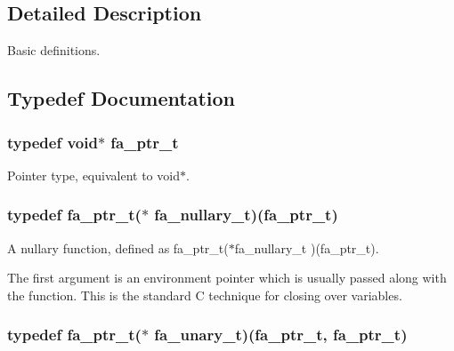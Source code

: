 \subsection{Detailed Description}
Basic definitions. 

\subsection{Typedef Documentation}
\hypertarget{group___fa_ga915ddeae99ad7568b273d2b876425197}{
\subsubsection[{fa\-\_\-ptr\-\_\-t}]{\setlength{\rightskip}{0pt plus 5cm}typedef void$\ast$ {\bf fa\-\_\-ptr\-\_\-t}}}\label{group___fa_ga915ddeae99ad7568b273d2b876425197}


Pointer type, equivalent to {\ttfamily void$\ast$}. 

\hypertarget{group___fa_ga43b940a9294fd58a54087ef0b416e479}{
\subsubsection[{fa\-\_\-nullary\-\_\-t}]{\setlength{\rightskip}{0pt plus 5cm}typedef {\bf fa\-\_\-ptr\-\_\-t}($\ast$  fa\-\_\-nullary\-\_\-t)({\bf fa\-\_\-ptr\-\_\-t})}}\label{group___fa_ga43b940a9294fd58a54087ef0b416e479}


A nullary function, defined as {\ttfamily fa\-\_\-ptr\-\_\-t($\ast$fa\-\_\-nullary\-\_\-t )(fa\-\_\-ptr\-\_\-t)}. 

The first argument is an environment pointer which is usually passed along with the function. This is the standard C technique for closing over variables. \hypertarget{group___fa_gaaafae8ab9ebae9019133108e56d2d4d1}{
\subsubsection[{fa\-\_\-unary\-\_\-t}]{\setlength{\rightskip}{0pt plus 5cm}typedef {\bf fa\-\_\-ptr\-\_\-t}($\ast$  fa\-\_\-unary\-\_\-t)({\bf fa\-\_\-ptr\-\_\-t}, {\bf fa\-\_\-ptr\-\_\-t})}}\label{group___fa_gaaafae8ab9ebae9019133108e56d2d4d1}


